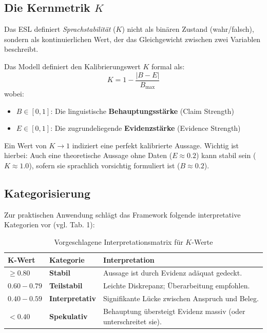 \documentclass[11pt, a4paper]{article}
\begin{document}
\subsection{Die Kernmetrik $K$}

Das ESL definiert \textit{Sprachstabilität} ($K$) nicht als binären Zustand (wahr/falsch), sondern als kontinuierlichen Wert, der das Gleichgewicht zwischen zwei Variablen beschreibt.

\begin{tcolorbox}[colback=eslgray, colframe=eslblue, title=Definition: Die Kalibrierungsfunktion]
Das Modell definiert den Kalibrierungswert $K$ formal als:
\begin{equation}
    K = 1 - \frac{|B - E|}{B_{\max}}
\end{equation}
wobei:
\begin{itemize}
    \item $B \in [0, 1]$: Die linguistische \textbf{Behauptungsstärke} (Claim Strength)
    \item $E \in [0, 1]$: Die zugrundeliegende \textbf{Evidenzstärke} (Evidence Strength)
\end{itemize}
\end{tcolorbox}

Ein Wert von $K \to 1$ indiziert eine perfekt kalibrierte Aussage. Wichtig ist hierbei: Auch eine theoretische Aussage ohne Daten ($E \approx 0.2$) kann stabil sein ($K \approx 1.0$), sofern sie sprachlich vorsichtig formuliert ist ($B \approx 0.2$).

\subsection{Kategorisierung}

Zur praktischen Anwendung schlägt das Framework folgende interpretative Kategorien vor (vgl. Tab. 1):

\begin{table}[h]
    \centering
    \caption{Vorgeschlagene Interpretationsmatrix für $K$-Werte}
    \vspace{0.2cm}
    \begin{tabular}{llp{7cm}}
        \toprule
        \textbf{K-Wert} & \textbf{Kategorie} & \textbf{Interpretation} \\
        \midrule
        $\geq 0.80$ & \textbf{Stabil} & Aussage ist durch Evidenz adäquat gedeckt. \\
        $0.60 - 0.79$ & \textbf{Teilstabil} & Leichte Diskrepanz; Überarbeitung empfohlen. \\
        $0.40 - 0.59$ & \textbf{Interpretativ} & Signifikante Lücke zwischen Anspruch und Beleg. \\
        $< 0.40$ & \textbf{Spekulativ} & Behauptung übersteigt Evidenz massiv (oder unterschreitet sie). \\
        \bottomrule
    \end{tabular}
\end{table}
\end{document}
